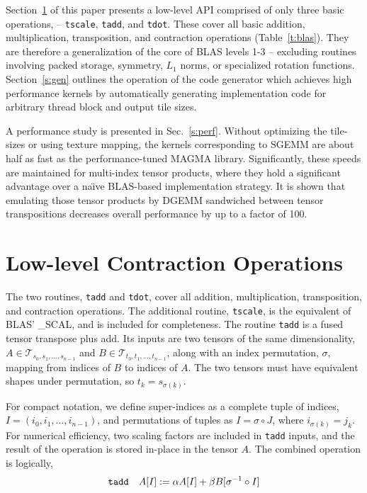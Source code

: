 \documentclass[preprint]{sigplanconf}
\begin{document}
  Section~\ref{s:low} of this paper presents a low-level API comprised of only three basic operations,
-- {\tt tscale}, {\tt tadd}, and {\tt tdot}.  These  cover all basic addition, multiplication, transposition,
and contraction operations (Table~\ref{t:blas}).
They are therefore a generalization of the core of BLAS levels 1-3
-- excluding routines involving packed storage, symmetry, $L_1$ norms, or specialized rotation functions.
Section~\ref{s:gen} outlines the operation of the code generator which
achieves high performance kernels by automatically generating implementation code for
arbitrary thread block and output tile sizes.

  A performance study is presented in Sec.~\ref{s:perf}.  Without optimizing the tile-sizes
or using texture mapping, the kernels corresponding to SGEMM are about half as fast
as the performance-tuned MAGMA library.  Significantly, these speeds are maintained
for multi-index tensor products, where they hold a significant advantage over a na\"{\i}ve
BLAS-based implementation strategy.
It is shown that emulating those tensor products by
DGEMM sandwiched between tensor transpositions decreases overall performance by up
to a factor of 100.%

\section{ Low-level Contraction Operations}\label{s:low}

  The two routines, {\tt tadd} and {\tt tdot}, cover all addition, multiplication, transposition,
and contraction operations.  The additional routine, {\tt tscale}, is the equivalent of BLAS' \_SCAL,
and is included for completeness.
The routine {\tt tadd} is a fused tensor transpose plus add.
Its inputs are two tensors of the same dimensionality, $A \in \mathcal T_{s_0,s_1,\ldots,s_{n-1}}$
and $B \in \mathcal T_{t_0,t_1,\ldots,t_{n-1}}$, along with an index permutation,
$\sigma$, mapping from indices of $B$ to indices of $A$.
The two tensors must have equivalent shapes under permutation, so $t_k = s_{\sigma(k)}$.

  For compact notation, we define super-indices as a complete tuple of indices,
$I = (i_0, i_1, \ldots, i_{n-1})$, and permutations of tuples as
$I = \sigma \circ J$, where $i_{\sigma(k)} = j_k$.
For numerical efficiency, two scaling factors are included in {\tt tadd}
inputs, and the result of the operation is stored in-place in the tensor $A$.
The combined operation is logically,
\begin{equation}
\text{\tt tadd} \quad A[I] := \alpha A[I] + \beta B[\sigma^{-1} \circ I]
\end{equation}
\end{document}
